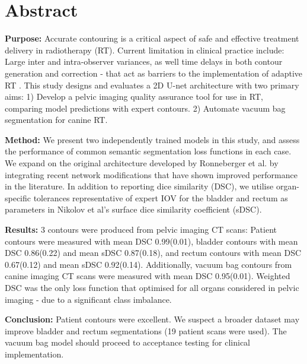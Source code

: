 \chapter{Abstract}
\label{ch:abstract}

\textbf{Purpose:} Accurate contouring is a critical aspect of safe and effective treatment delivery in radiotherapy (RT). Current limitation in clinical practice include:  Large inter and intra-observer variances, as well time delays in both contour generation and correction - that act as barriers to the implementation of adaptive RT . This study designs and evaluates a 2D U-net architecture with two primary aims: 1) Develop a pelvic imaging quality assurance tool for use in RT, comparing model predictions with expert contours. 2) Automate vacuum bag segmentation for canine RT.

\textbf{Method:}
 We present two independently trained models in this study, and assess the performance of common semantic segmentation loss functions in each case. We expand on the original architecture developed by Ronneberger et al. by integrating recent network modifications that have shown improved performance in the literature. In addition to reporting dice similarity (DSC), we utilise organ-specific tolerances representative of expert IOV for the bladder and rectum as parameters in Nikolov et al's surface dice similarity coefficient (sDSC).

\textbf{Results:}
3 contours were produced from pelvic imaging CT scans: Patient contours were measured with mean DSC 0.99(0.01), bladder contours with mean DSC 0.86(0.22) and mean sDSC 0.87(0.18), and rectum contours with mean DSC 0.67(0.12) and mean sDSC 0.92(0.14). Additionally, vacuum bag contours from canine imaging CT scans were measured with mean DSC 0.95(0.01). Weighted DSC was the only loss function that optimised for all organs considered in pelvic imaging - due to a significant class imbalance.

\textbf{Conclusion:}
Patient contours were excellent. We suspect a broader dataset may improve bladder and rectum segmentations (19 patient scans were used). The vacuum bag model should proceed to acceptance testing for clinical implementation.
